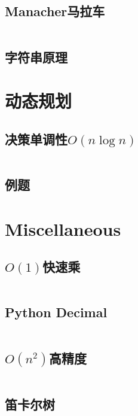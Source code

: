 \documentclass[a4paper]{article}
\begin{document}
\begin{multicols}{2}
			\subsection{Manacher马拉车}
				\inputminted{cpp}{../src/string/manacher.cpp}
			


			\subsection{字符串原理}
				

			\section{动态规划}
				\subsection{决策单调性$O(n\log n)$}
					\inputminted{cpp}{../src/DP/决策单调性.cpp}
				
				\subsection{例题}

				
			\section{Miscellaneous}
				\subsection{$O(1)$快速乘}
					\inputminted{cpp}{../src/misc/O(1)快速乘.cpp}
				
				\subsection{Python Decimal}
					\inputminted{python}{../src/misc/decimal.py}
				
				\subsection{$O(n^2)$高精度}
					\inputminted{cpp}{../src/misc/高精度.cpp}
				
				\subsection{笛卡尔树}
					\inputminted{cpp}{../src/misc/笛卡尔树.cpp}
				

\end{multicols}
\end{document}
